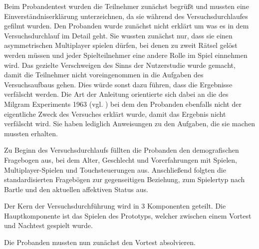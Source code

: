 Beim Probandentest wurden die Teilnehmer zunächst begrüßt und mussten eine Einverständniserklärung unterzeichnen, da sie während des Versuchsdurchlaufes gefilmt wurden. Den Probanden wurde zunächst nicht erklärt um was es in dem Versuchsdurchlauf im Detail geht. Sie wussten zunächst nur, dass sie einen asymmetrischen Multiplayer spielen dürfen, bei denen zu zweit Rätsel gelöst werden müssen und jeder Spielteilnehmer eine andere Rolle im Spiel einnehmen wird. Das gezielte Verschweigen des Sinns der Nutzerstudie wurde gemacht, damit die Teilnehmer nicht voreingenommen in die Aufgaben des Versuchsaufbaus gehen. Dies würde sonst dazu führen, dass die Ergebnisse verfälscht werden. Die Art der Anleitung orientierte sich dabei an die des Milgram Experiments 1963 (vgl. \cite{milgram_behavioral_1963}) bei dem den Probanden ebenfalls nicht der eigentliche Zweck des Versuches erklärt wurde, damit das Ergebnis nicht verfälscht wird. Sie haben lediglich Anweisungen zu den Aufgaben, die sie machen mussten erhalten. 

Zu Beginn des Versuchsdurchlaufs füllten die Probanden den demografischen Fragebogen aus, bei dem Alter, Geschlecht und Vorerfahrungen mit Spielen, Multiplayer-Spielen und Touchsteuerungen aus. Anschließend folgten die standardisierten Fragebögen zur gegenseitigen Beziehung, zum Spielertyp nach Bartle und den aktuellen affektiven Status aus.

Der Kern der Versuchsdurchführung wird in 3 Komponenten geteilt. Die Hauptkomponente ist das Spielen des Prototyps, welcher zwischen einem Vortest und Nachtest gespielt wurde.

Die Probanden mussten nun zunächst den Vortest absolvieren. 


